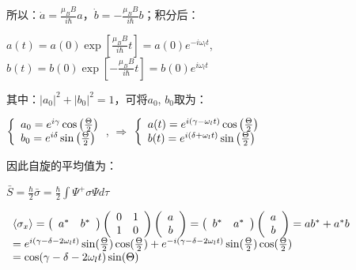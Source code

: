 所以：$\dot a = \frac{{\mu _B B}}{{i\hbar }}a$，$\dot b =  - \frac{{\mu _B B}}{{i\hbar }}b$；积分后：


$a\left( t \right) = a\left( 0 \right)\exp \left[ {\frac{{\mu _B B}}{{i\hbar }}t} \right] = a\left( 0 \right)e^{ - i\omega _l t} $, $b\left( t \right) = b\left( 0 \right)\exp \left[ { - \frac{{\mu _B B}}{{i\hbar }}t} \right] = b\left( 0 \right)e^{i\omega _l t} $

其中：$\left| {a_0 } \right|^2  + \left| {b_0 } \right|^2  = 1$，可将$a_0$, $b_0$取为：


$\left\{ \begin{array}{l}
 a_0  = e^{i\gamma } \cos \left( {{\textstyle{\Theta  \over 2}}} \right) \\
 b_0  = e^{i\delta } \sin \left( {{\textstyle{\Theta  \over 2}}} \right) \\
 \end{array} \right.$, $\Rightarrow$
$\left\{ \begin{array}{l}
 a(t) = e^{i(\gamma  - \omega _l t)} \cos \left( {{\textstyle{\Theta  \over 2}}} \right) \\
 b(t) = e^{i(\delta  + \omega _l t)} \sin \left( {{\textstyle{\Theta  \over 2}}} \right) \\
 \end{array} \right.$


因此自旋的平均值为：

$\bar S = \frac{\hbar }{2}\bar \sigma  = \frac{\hbar }{2}\int {\Psi ^ +  \sigma \Psi d\tau } $


$\begin{array}{l}
 \left\langle {\sigma _x } \right\rangle  = \left( {\begin{array}{*{20}c}
   {a^* } & {b^* }  \\
\end{array}} \right)\left( {\begin{array}{*{20}c}
   0 & 1  \\
   1 & 0  \\
\end{array}} \right)\left( {\begin{array}{*{20}c}
   a  \\
   b  \\
\end{array}} \right) = \left( {\begin{array}{*{20}c}
   {b^* } & {a^* }  \\
\end{array}} \right)\left( {\begin{array}{*{20}c}
   a  \\
   b  \\
\end{array}} \right) = ab^*  + a^* b \\
  = e^{i(\gamma  - \delta  - 2\omega _l t)} \sin ({\textstyle{\Theta  \over 2}})\cos ({\textstyle{\Theta  \over 2}}) + e^{ - i(\gamma  - \delta  - 2\omega _l t)} \sin ({\textstyle{\Theta  \over 2}})\cos ({\textstyle{\Theta  \over 2}}) \\
  = \cos (\gamma  - \delta  - 2\omega _l t)\sin (\Theta ) \\
 \end{array}$


